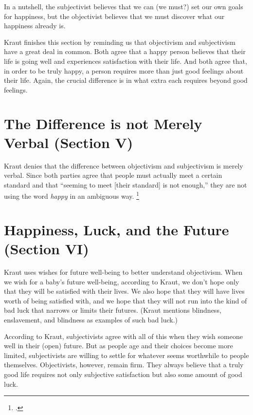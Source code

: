 \documentclass[12pt,letterpaper]{article}
\begin{document}
In a nutshell, the subjectivist believes that we can (we must?) set our own goals for happiness, but the objectivist believes that we must discover what our happiness already is.

Kraut finishes this section by reminding us that objectivism and subjectivism have a great deal in common.
Both agree that a happy person believes that their life is going well and experiences satisfaction with their life.
And both agree that, in order to be truly happy, a person requires more than just good feelings about their life.
Again, the crucial difference is in what extra each requires beyond good feelings.

\section*{The Difference is not Merely Verbal (Section V)}

Kraut denies that the difference between objectivism and subjectivism is merely verbal.
Since both parties agree that people must actually meet a certain standard and that ``seeming to meet [their standard] is not enough,'' they are not using the word \textit{happy} in an ambiguous way.%
\footcite[][182]{two-conceptions-of-happiness-kraut-1979}

\section*{Happiness, Luck, and the Future (Section VI)}

Kraut uses wishes for future well-being to better understand objectivism.
When we wish for a baby's future well-being, according to Kraut, we don't hope only that they will be satisfied with their lives.
We also hope that they will have lives worth of being satisfied with, and we hope that they will not run into the kind of bad luck that narrows or limits their futures.
(Kraut mentions blindness, enslavement, and blindness as examples of such bad luck.)

According to Kraut, subjectivists agree with all of this when they wish someone well in their (open) future.
But as people age and their choices become more limited, subjectivists are willing to settle for whatever seems worthwhile to people themselves.
Objectivists, however, remain firm.
They always believe that a truly good life requires not only subjective satisfaction but also some amount of good luck.
\end{document}
